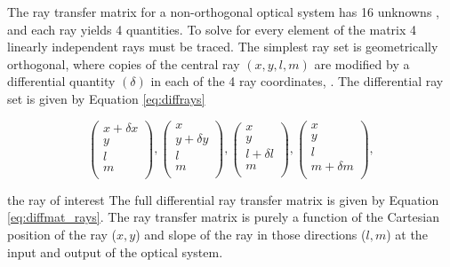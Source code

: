 The ray transfer matrix for a non-orthogonal optical system has 16 unknowns , and each ray yields 4 quantities. To solve for every element of the matrix 4 linearly independent rays must be traced. The simplest ray set is geometrically orthogonal\cite{Greynolds86}, where copies of the central ray $(x,y,l,m)$ are modified by a differential quantity $(\delta)$ in each of the 4 ray coordinates, . The differential ray set is given by Equation \ref{eq:diffrays}
\begin{center}
    
\begin{equation}
    \begin{pmatrix}
    x + \delta x \\
    y \\
    l \\
    m \\
    \end{pmatrix}
    ,
    \begin{pmatrix}
    x \\
    y + \delta y \\
    l \\
    m \\
    \end{pmatrix}
    ,
    \begin{pmatrix}
    x \\
    y \\
    l + \delta l\\
    m \\
    \end{pmatrix}
    ,
    \begin{pmatrix}
    x \\
    y \\
    l \\
    m + \delta m\\
    \end{pmatrix},
    \label{eq:diffrays}
\end{equation}

\end{center}
 the  ray of interest The full differential ray transfer matrix is given by Equation \ref{eq:diffmat_rays}. The ray transfer matrix is purely a function of the Cartesian position of the ray ($x, y$) and  slope of the ray in those directions ($l, m$) at the input and output of the optical system. 


